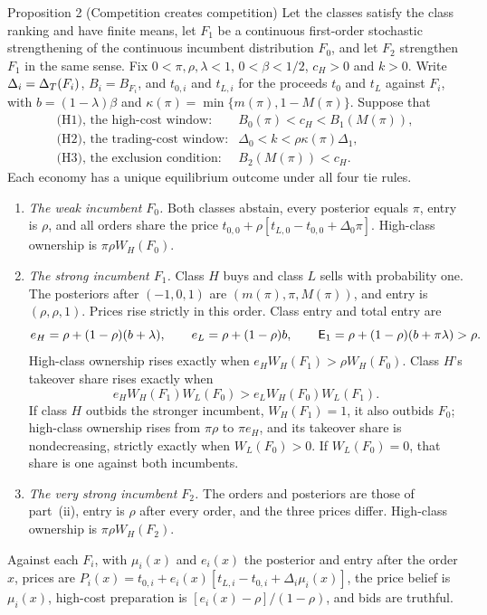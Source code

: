 \begin{paperresult}{Proposition 2 (Competition creates competition)}
Let the classes satisfy the class ranking and have finite means, let \(F_1\) be a continuous first-order
stochastic strengthening of the continuous incumbent distribution \(F_0\), and let \(F_2\) strengthen \(F_1\) in
the same sense. Fix \(0<\pi,\rho,\lambda<1\), \(0<\beta<1/2\), \(c_H>0\) and \(k>0\). Write \(\Delta_i=\Delta_T(F_i)\),
\(B_i=B_{F_i}\), and \(t_{0,i}\) and \(t_{L,i}\) for the proceeds \(t_0\) and \(t_L\) against \(F_i\), with
\(b=(1-\lambda)\beta\) and \(\kappa(\pi)=\min\{m(\pi),1-M(\pi)\}\). Suppose that
\[
\begin{array}{ll}
\text{(H1), the high-cost window:}& B_0(\pi)<c_H<B_1(M(\pi)),\\
\text{(H2), the trading-cost window:}& \Delta_0<k<\rho\kappa(\pi)\Delta_1,\\
\text{(H3), the exclusion condition:}& B_2(M(\pi))<c_H.
\end{array}
\]
Each economy has a unique equilibrium outcome under all four tie rules.
\begin{enumerate}[label=(\roman*),leftmargin=2em]
\item \emph{The weak incumbent \(F_0\).} Both classes abstain, every posterior equals \(\pi\), entry is \(\rho\),
  and all orders share the price \(t_{0,0}+\rho[t_{L,0}-t_{0,0}+\Delta_0\pi]\). High-class ownership is
  \(\pi\rho W_H(F_0)\).
\item \emph{The strong incumbent \(F_1\).} Class \(H\) buys and class \(L\) sells with probability one. The
  posteriors after \((-1,0,1)\) are \((m(\pi),\pi,M(\pi))\), and entry is \((\rho,\rho,1)\). Prices rise strictly in
  this order. Class entry and total entry are
  \[
  e_H=\rho+(1-\rho)(b+\lambda),\qquad e_L=\rho+(1-\rho)b,\qquad \mathsf{E}_1=\rho+(1-\rho)(b+\pi\lambda)>\rho.
  \]
  High-class ownership rises exactly when \(e_HW_H(F_1)>\rho W_H(F_0)\). Class \(H\)'s takeover share rises exactly
  when
  \begin{equation}\label{eq:ccc-share}
  e_HW_H(F_1)W_L(F_0)>e_LW_H(F_0)W_L(F_1).
  \end{equation}
  If class \(H\) outbids the stronger incumbent, \(W_H(F_1)=1\), it also outbids \(F_0\); high-class ownership rises
  from \(\pi\rho\) to \(\pi e_H\), and its takeover share is nondecreasing, strictly exactly when \(W_L(F_0)>0\). If
  \(W_L(F_0)=0\), that share is one against both incumbents.
\item \emph{The very strong incumbent \(F_2\).} The orders and posteriors are those of part~(ii), entry is \(\rho\)
  after every order, and the three prices differ. High-class ownership is \(\pi\rho W_H(F_2)\).
\end{enumerate}
Against each \(F_i\), with \(\mu_i(x)\) and \(e_i(x)\) the posterior and entry after the order \(x\), prices are
\(P_i(x)=t_{0,i}+e_i(x)[t_{L,i}-t_{0,i}+\Delta_i\mu_i(x)]\), the price belief is \(\mu_i(x)\), high-cost preparation
is \([e_i(x)-\rho]/(1-\rho)\), and bids are truthful.
\end{paperresult}

